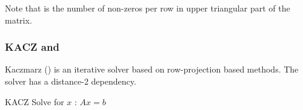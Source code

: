 Note that \NNZRSYMM is the number of non-zeros per row in upper triangular part of the matrix.

\begin{comment}
\subsubsection{\GS and \SYMMGS}
Gauss-Seidel (\GS) is a solver having distance-1 dependency. Contrary to the above kernels \GS is in-exact meaning it is an iterative method. \Cref{alg:GS} shows the Gauss-Seidel algorithm where its assumed that the diagonal entries of the matrix are stored as first entry in their corresponding rows.
\begin{algorithm}[H]
	\caption{GS Solve for $x$ : $Ax=b$} 
	\label{alg:GS}
	\begin{algorithmic}[1]
		\FOR{$row=1:nrows$}
		\STATE{$x[row]+=b[row]$}
		\FOR{$idx=rowPtr[row]+1:rowPtr[row+1]$}
		\STATE{$x[row] -= A[idx]*x[col[idx]]$} 
		\ENDFOR
		\STATE{$diag=A[rowPtr[row]]$}
		\STATE{$x[row]/=diag$}
		\ENDFOR
	\end{algorithmic}
\end{algorithm}
Regarding the in-core execution the kernel has same properties as of \SpMV, but requires an additional divide operation per row of the matrix. If the locality ($\alpha$ factor) is not disturbed due to pre-processing the kernel requires same data traffic as of \SpMV. The arithmetic intensity of \GS is the same as that of \SpMV, if we neglect the divide operation that occurs once per every row.
\begin{equation}
\label{eq:GS_intensity}
I_\mathrm{GS} = I_\mathrm{SPMV}
\end{equation}

In general for most of the algorithms one is interested in symmetric operator therefore commonly one would encounter symmetric variant of Gauss-Seidel, so called symmetric Gauss-Seidel (\SYMMGS). The algorithm remains same except that instead of just doing forward sweep shown in \cref{alg:GS} one would follow it with a backward sweep \ie {\tt row=nrows:-1:1}. The intensity of \SYMMGS remains same as of \GS, as we do two times more flops and bring in proportional data.
\end{comment}

\subsubsection{KACZ and \SYMMKACZ}
Kaczmarz (\KACZ) is an iterative solver based on row-projection based methods. The solver has a distance-2 dependency.
\begin{algorithm}[H]
	\caption{KACZ Solve for $x$ : $Ax=b$} 
	\label{alg:KACZ}
	\begin{algorithmic}[1]
		\ENDFOR
		\ENDFOR
		\ENDFOR
	\end{algorithmic}
\end{algorithm}

